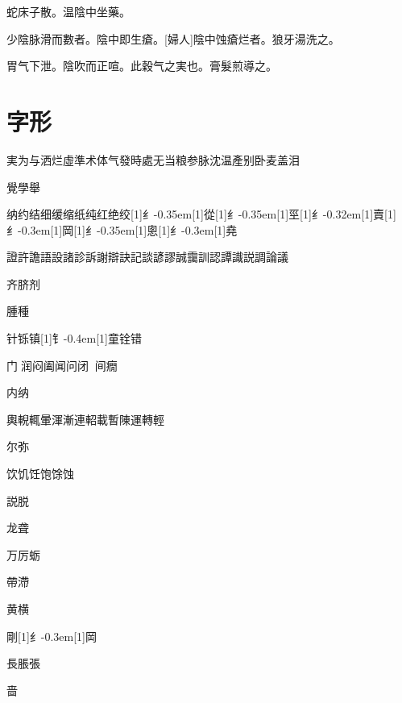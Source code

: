 \documentclass[oneside,b4paper]{ctexbook}
\begin{document}
\begin{flushleft}
蛇床子散。温陰中坐藥。

少陰脉滑而數者。陰中即生瘡。[婦人]陰中蚀瘡烂者。狼牙湯洗之。

胃气下泄。陰吹而正喧。此穀气之実也。膏髮煎導之。

\chapter{字形}

実为与洒烂虛準术体气發時處无当粮参脉沈温產别卧麦盖泪{𧌒}{𩊅}

覺學舉

纳约结细缓缩纸纯红绝绞{\hbox{\scalebox{0.6}[1]{纟}\kern-0.35em\scalebox{0.7}[1]{從}}}{\hbox{\scalebox{0.68}[1]{纟}\kern-0.35em\scalebox{0.64}[1]{巠}}}{\hbox{\scalebox{0.6}[1]{纟}\kern-0.32em\scalebox{0.7}[1]{賣}}}{\hbox{\scalebox{0.6}[1]{纟}\kern-0.3em\scalebox{0.63}[1]{岡}}}{\hbox{\scalebox{0.65}[1]{纟}\kern-0.35em\scalebox{0.68}[1]{悤}}}{\hbox{\scalebox{0.6}[1]{纟}\kern-0.3em\scalebox{0.63}[1]{堯}}}

證許譫語設諸診訴謝辯訣記談諺謬誠靄訓認譚識説調論議

齐脐剂

腫種

针铄镇{\hbox{\scalebox{0.7}[1]{钅}\kern-0.4em\scalebox{0.7}[1]{童}}}铨错

门{𥆧}润闷阖闻问闭{𫔭}{𬮦}间癇

内纳

輿輗輒暈渾漸連軺載暫陳運轉輕

尔弥

饮饥饪饱馀蚀

説脱

龙聋

万厉蛎

帶滯

黄横

剛{\hbox{\scalebox{0.6}[1]{纟}\kern-0.3em\scalebox{0.63}[1]{岡}}}

長脹張

啬{𬈧}
\end{flushleft}
\end{document}
